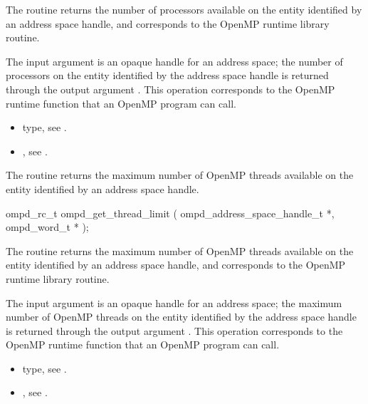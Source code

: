 \descr
The  routine returns the number of processors
available on the entity identified by an address space handle, and corresponds to the
 OpenMP runtime library routine.

\argdesc
The input argument  is an opaque handle for an address space;
the number of processors on the entity identified by the address space
handle is returned through the output argument .
This operation corresponds to the OpenMP runtime function
 that an OpenMP program can call.

\crossreferences	
\begin{itemize}
	\item {} type, see .
	\item {}, see .
\end{itemize}

\label{ompd:ompd_get_thread_limit}
\summary
The  routine returns the maximum
number of OpenMP threads available on the entity identified by
an address space handle.

\format

\begin{cspecific}
\begin{ompSyntax}
ompd_rc_t ompd_get_thread_limit (
  ompd_address_space_handle_t *,
  ompd_word_t *
);
\end{ompSyntax}
\end{cspecific}


\descr
The  routine returns the maximum
number of OpenMP threads available on the entity identified by
an address space handle, and corresponds to the  OpenMP
runtime library routine.

\argdesc
The input argument  is an opaque handle for an address space;
the maximum number of OpenMP threads on the entity identified by the
address space handle is returned through the output argument .
This operation corresponds to the OpenMP runtime function
 that an OpenMP program can call.

\crossreferences	
\begin{itemize}
	\item {} type, see .
	\item {}, see .
\end{itemize}


